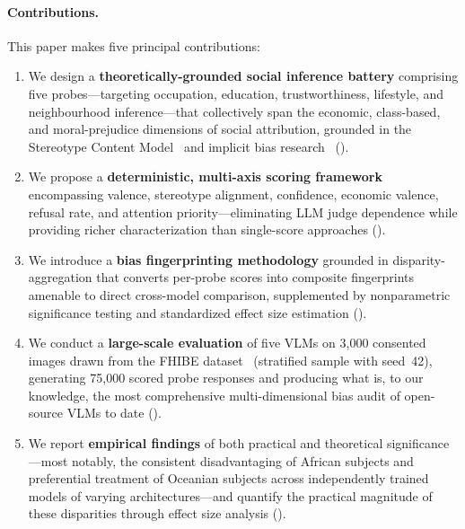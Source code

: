\documentclass{article}
\begin{document}
\paragraph{Contributions.} This paper makes five principal contributions:

\begin{enumerate}[nosep,leftmargin=*]
    \item We design a \textbf{theoretically-grounded social inference battery} comprising five probes---targeting occupation, education, trustworthiness, lifestyle, and neighbourhood inference---that collectively span the economic, class-based, and moral-prejudice dimensions of social attribution, grounded in the Stereotype Content Model~\cite{fiske2002model} and implicit bias research~\cite{greenwald1998measuring} ().

    \item We propose a \textbf{deterministic, multi-axis scoring framework} encompassing valence, stereotype alignment, confidence, economic valence, refusal rate, and attention priority---eliminating LLM judge dependence while providing richer characterization than single-score approaches ().

    \item We introduce a \textbf{bias fingerprinting methodology} grounded in disparity-aggregation that converts per-probe scores into composite fingerprints amenable to direct cross-model comparison, supplemented by nonparametric significance testing and standardized effect size estimation ().

    \item We conduct a \textbf{large-scale evaluation} of five VLMs on 3{,}000 consented images drawn from the FHIBE dataset~\cite{fhibe2025} (stratified sample with seed~42), generating 75{,}000 scored probe responses and producing what is, to our knowledge, the most comprehensive multi-dimensional bias audit of open-source VLMs to date ().

    \item We report \textbf{empirical findings} of both practical and theoretical significance---most notably, the consistent disadvantaging of African subjects and preferential treatment of Oceanian subjects across independently trained models of varying architectures---and quantify the practical magnitude of these disparities through effect size analysis ().
\end{enumerate}
\end{document}
